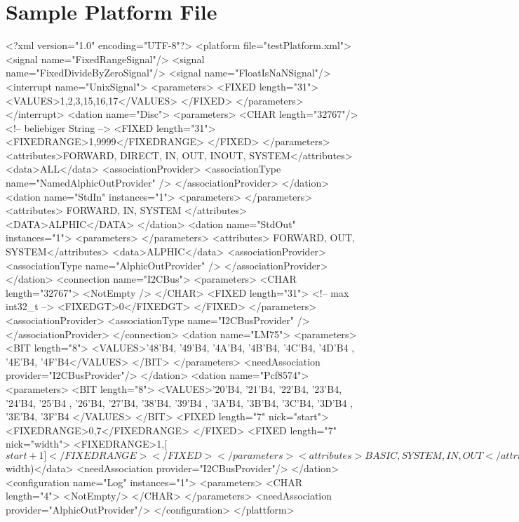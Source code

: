 \section{Sample Platform File}
\begin{XMLCode}
<?xml version="1.0" encoding="UTF-8"?>
<platform file="testPlatform.xml">
   <signal name="FixedRangeSignal"/>
   <signal name="FixedDivideByZeroSignal"/>
   <signal name="FloatIsNaNSignal"/>
   <interrupt name="UnixSignal">
      <parameters>
         <FIXED length="31">
            <VALUES>1,2,3,15,16,17</VALUES>
         </FIXED>
      </parameters>
   </interrupt>
   <dation name="Disc">
      <parameters>
         <CHAR length="32767"/>	<!-- beliebiger String -->
         <FIXED length="31">
            <FIXEDRANGE>1,9999</FIXEDRANGE>
         </FIXED>
      </parameters>
      <attributes>FORWARD, DIRECT, IN, OUT, INOUT, SYSTEM</attributes>
      <data>ALL</data>
      <associationProvider>
         <associationType name="NamedAlphicOutProvider" />
      </associationProvider>
   </dation>
   <dation name="StdIn" instances="1">
      <parameters>
      </parameters>
      <attributes>
         FORWARD, IN, SYSTEM
      </attributes>
      <DATA>ALPHIC</DATA>
   </dation>
   <dation name="StdOut" instances="1">
      <parameters>
      </parameters>
      <attributes> FORWARD, OUT, SYSTEM</attributes>
      <data>ALPHIC</data>
      <associationProvider>
         <associationType name="AlphicOutProvider" />
      </associationProvider>
   </dation>
   <connection name="I2CBus">
      <parameters>
         <CHAR length="32767">
            <NotEmpty />
         </CHAR>
         <FIXED length="31">	<!-- max int32_t -->
            <FIXEDGT>0</FIXEDGT>
         </FIXED>
      </parameters>
      <associationProvider>
         <associationType name="I2CBusProvider" />
      </associationProvider>
   </connection>
   <dation name="LM75">
      <parameters>
         <BIT length="8">
            <VALUES>'48'B4, '49'B4, '4A'B4, '4B'B4,
                    '4C'B4, '4D'B4 , '4E'B4, '4F'B4</VALUES>
         </BIT>
      </parameters>
      <needAssociation provider="I2CBusProvider"/>
   </dation>
   <dation name="Pcf8574">
      <parameters>
         <BIT length="8">
            <VALUES>'20'B4, '21'B4, '22'B4, '23'B4,
                    '24'B4, '25'B4 , '26'B4, '27'B4,
                    '38'B4, '39'B4 , '3A'B4, '3B'B4,
                    '3C'B4, '3D'B4 , '3E'B4, '3F'B4
            </VALUES>
         </BIT>
         <FIXED length="7" nick="start">
            <FIXEDRANGE>0,7</FIXEDRANGE>
         </FIXED>
         <FIXED length="7" nick="width">
            <FIXEDRANGE>1,[$start+1]</FIXEDRANGE>
         </FIXED>
      </parameters>
      <attributes>
         BASIC, SYSTEM, IN, OUT
      </attributes>
      <data>BIT($width)</data>
      <needAssociation provider="I2CBusProvider"/>
   </dation>
  <configuration name="Log" instances="1">
    <parameters>
      <CHAR length="4">
         <NotEmpty/>
      </CHAR>
    </parameters>
    <needAssociation provider="AlphicOutProvider"/>
  </configuration>
</plattform>
\end{XMLCode}
